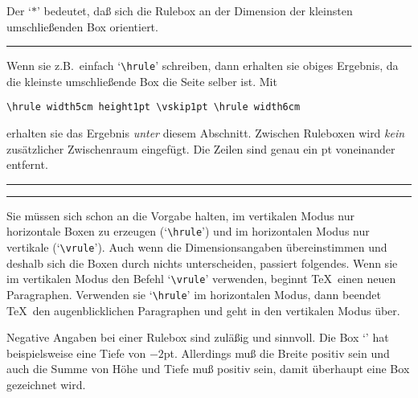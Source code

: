 Der `$*$' bedeutet, da\ss{} sich die Rulebox an der 
Dimension der kleinsten umschlie\ss{}enden Box orientiert.\medskip

\hrule\medskip

Wenn sie z.B.\ einfach 
`\verb|\hrule|' schreiben, dann erhalten sie
obiges Ergebnis, da die kleinste umschlie\ss{}ende Box die Seite selber
ist. Mit
\begin{verbatim}
\hrule width5cm height1pt \vskip1pt \hrule width6cm
\end{verbatim}
erhalten sie das Ergebnis {\em unter} diesem Abschnitt. Zwischen
Ruleboxen wird {\em kein} zus\"atzlicher 
Zwischenraum eingef\"ugt. Die
Zeilen sind genau ein pt voneinander entfernt.\medskip

\hrule width5cm height1pt \vskip1pt \hrule width6cm\medskip

Sie m\"ussen sich schon an die Vorgabe halten, im vertikalen Modus nur
horizontale Boxen zu erzeugen (`\verb|\hrule|') und im
horizontalen
Modus nur vertikale 
(`\verb|\vrule|'). Auch wenn die
Dimensionsangaben
\"ubereinstimmen und deshalb sich die Boxen durch nichts unterscheiden,
passiert folgendes. Wenn sie im vertikalen Modus den Befehl
`\verb|\vrule|' verwenden, beginnt \TeX\ einen 
neuen Paragraphen.
Verwenden sie 
`\verb|\hrule|' im horizontalen Modus, dann beendet
\TeX\ den augenblicklichen Paragraphen und geht in den vertikalen
Modus \"uber.

Negative Angaben bei einer Rulebox sind zul\"a\ss{}ig und sinnvoll. Die Box
`\vrule width3cm depth-2pt' hat beispielsweise eine Tiefe von $-2$pt.
Allerdings mu\ss{} die Breite positiv sein und auch die Summe von
H\"ohe und
Tiefe mu\ss{} positiv sein, damit \"uberhaupt eine Box gezeichnet wird.
